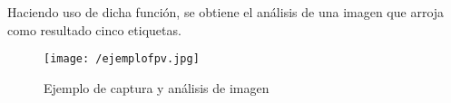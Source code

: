 Haciendo uso de dicha función, se obtiene el análisis de una imagen que arroja como resultado cinco etiquetas.  

\begin{figure}[!h]
\begin{center}
\texttt{[image: /ejemplofpv.jpg]}
\caption[Ejemplo de captura y análisis de imagen]{Ejemplo de captura y análisis de imagen}
\label{fig:ejemplofpv}
\end{center}
\end{figure}

